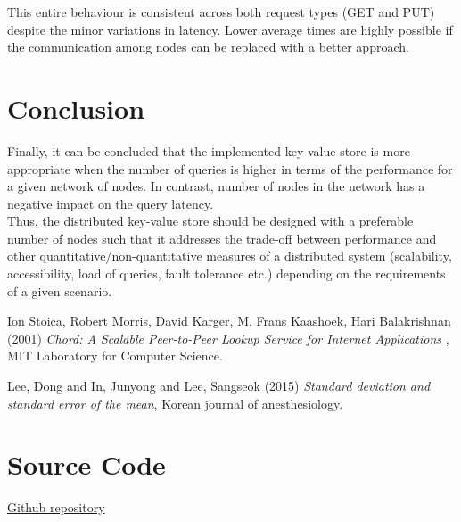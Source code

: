 \documentclass[
    a4paper,
    twocolumn,
]{article}
\begin{document}
This entire behaviour is consistent across both request types (GET and PUT) despite the minor variations in latency. Lower average times are highly possible if the communication among nodes can be replaced with a better approach.

\section{Conclusion}

Finally, it can be concluded that the implemented key-value store is more appropriate when the number of queries is higher in terms of the performance for a given network of nodes. In contrast, number of nodes in the network has a negative impact on the query latency. \\ 

Thus, the distributed key-value store should be designed with a preferable number of nodes such that it addresses the trade-off between performance and other quantitative/non-quantitative measures of a distributed system (scalability, accessibility, load of queries, fault tolerance etc.) depending on the requirements of a given scenario.

\begin{thebibliography}{9}	
	Ion Stoica, Robert Morris, David Karger, M. Frans Kaashoek, Hari Balakrishnan (2001) \emph{Chord: A Scalable Peer-to-Peer Lookup Service for Internet Applications }, MIT Laboratory for Computer Science.
	
	Lee, Dong and In, Junyong and Lee, Sangseok (2015) \emph{Standard deviation and standard error of the mean}, Korean journal of anesthesiology.
\end{thebibliography}

\appendix
\section{Source Code}
\href{https://github.com/YasiruR/dht/tree/master}{Github repository}
\end{document}
